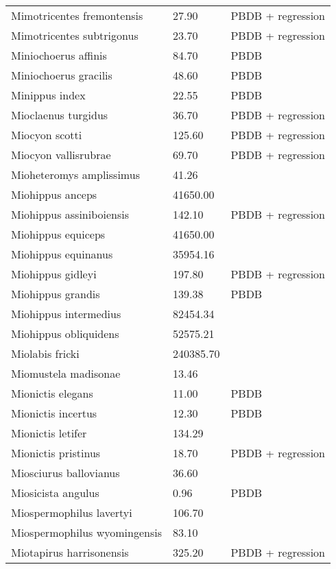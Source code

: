 \documentclass{article}
\begin{document}
\begin{center}
\begin{longtable}{p{} p{} p{}}
    Mimotricentes fremontensis & 27.90 & PBDB + regression \\ 
    Mimotricentes subtrigonus & 23.70 & PBDB + regression \\ 
    Miniochoerus affinis & 84.70 & PBDB \\ 
    Miniochoerus gracilis & 48.60 & PBDB \\ 
    Minippus index & 22.55 & PBDB \\ 
    Mioclaenus turgidus & 36.70 & PBDB + regression \\ 
    Miocyon scotti & 125.60 & PBDB + regression \\ 
    Miocyon vallisrubrae & 69.70 & PBDB + regression \\ 
    Mioheteromys amplissimus & 41.26 & \cite{Tomiya2013} \\ 
    Miohippus anceps & 41650.00 & \cite{McKenna2011} \\ 
    Miohippus assiniboiensis & 142.10 & PBDB + regression \\ 
    Miohippus equiceps & 41650.00 & \cite{McKenna2011} \\ 
    Miohippus equinanus & 35954.16 & \cite{Tomiya2013} \\ 
    Miohippus gidleyi & 197.80 & PBDB + regression \\ 
    Miohippus grandis & 139.38 & PBDB \\ 
    Miohippus intermedius & 82454.34 & \cite{Tomiya2013} \\ 
    Miohippus obliquidens & 52575.21 & \cite{Tomiya2013} \\ 
    Miolabis fricki & 240385.70 & \cite{Tomiya2013} \\ 
    Miomustela madisonae & 13.46 & \cite{Tomiya2013} \\ 
    Mionictis elegans & 11.00 & PBDB \\ 
    Mionictis incertus & 12.30 & PBDB \\ 
    Mionictis letifer & 134.29 & \cite{Tomiya2013} \\ 
    Mionictis pristinus & 18.70 & PBDB + regression \\ 
    Miosciurus ballovianus & 36.60 & \cite{Tomiya2013} \\ 
    Miosicista angulus & 0.96 & PBDB \\ 
    Miospermophilus lavertyi & 106.70 & \cite{Tomiya2013} \\ 
    Miospermophilus wyomingensis & 83.10 & \cite{Tomiya2013} \\ 
    Miotapirus harrisonensis & 325.20 & PBDB + regression \\ 

\end{longtable}
\end{center}
\end{document}

